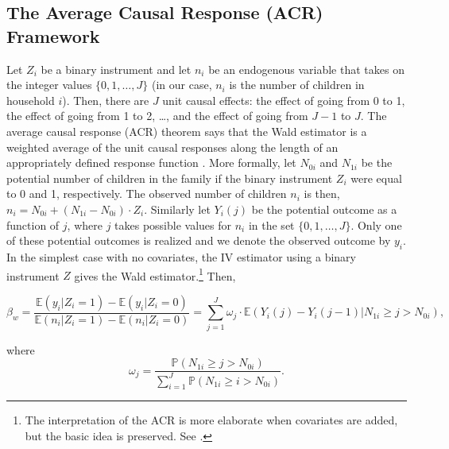
\subsection{The Average Causal Response (ACR) Framework}
\label{section:acr-detail}

Let $ Z_{i} $ be a binary instrument and let $ n_{i} $ be an endogenous variable that takes on the integer values $ \{0, 1, \dots, J\} $ (in our case, $ n_{i} $ is the number of children in household $ i $). Then, there are $ J $ unit causal effects: the effect of going from 0 to 1, the effect of going from 1 to 2, \dots, and the effect of going from $ J-1 $ to $ J $. The average causal response (ACR) theorem says that the Wald estimator is a weighted average of the unit causal responses along the length of an appropriately defined response function \parencite{Angrist2009,Angrist1995}. More formally, let $ N_{0i} $ and $ N_{1i} $ be the potential number of children in the family if the binary instrument $ Z_{i} $ were equal to 0 and 1, respectively. The observed number of children $ n_{i} $ is then, $ n_{i} = N_{0i} + (N_{1i} - N_{0i})\cdot Z_{i} $. Similarly let $ Y_{i}(j) $ be the potential outcome as a function of $ j $, where $ j $ takes possible values for $ n_{i} $ in the set $ \{0, 1, \dots, J\} $. Only one of these potential outcomes is realized and we denote the observed outcome by $ y_{i} $. In the simplest case with no covariates, the IV estimator using a binary instrument $ Z $ gives the Wald estimator.\footnote{The interpretation of the ACR is more elaborate when covariates are added, but the basic idea is preserved. See \textcite[p.~437]{Angrist1995}.} Then,

\begin{equation}\label{eq:02}
	\beta_{w} = \dfrac{\mathbb{E}(y_{i} | Z_{i} = 1) - \mathbb{E}(y_{i} | Z_{i} = 0)}{\mathbb{E}(n_{i} | Z_{i} = 1) - \mathbb{E}(n_{i} | Z_{i} = 0)} = \sum_{j = 1}^{J} \omega_{j}\cdot \mathbb{E}(Y_{i}(j) - Y_{i}(j-1) | N_{1i} \geq j > N_{0i}),
\end{equation}

where
\begin{equation}\label{eq:03}
\omega_{j} = \dfrac{\mathbb{P}(N_{1i} \geq j > N_{0i})}{\sum_{i = 1}^{J} \mathbb{P}(N_{1i} \geq i > N_{0i})}.
\end{equation}
\vskip10pt

